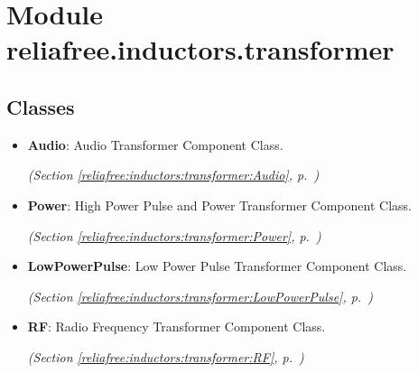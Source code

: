 %
%
%


\section{Module reliafree.inductors.transformer}

    \label{reliafree:inductors:transformer}


\subsection{Classes}

\begin{itemize}  \setlength{\parskip}{0ex}
  \item \textbf{Audio}: Audio Transformer Component Class.



  \textit{(Section \ref{reliafree:inductors:transformer:Audio}, p.~\pageref{reliafree:inductors:transformer:Audio})}

  \item \textbf{Power}: High Power Pulse and Power Transformer Component Class.



  \textit{(Section \ref{reliafree:inductors:transformer:Power}, p.~\pageref{reliafree:inductors:transformer:Power})}

  \item \textbf{LowPowerPulse}: Low Power Pulse Transformer Component Class.



  \textit{(Section \ref{reliafree:inductors:transformer:LowPowerPulse}, p.~\pageref{reliafree:inductors:transformer:LowPowerPulse})}

  \item \textbf{RF}: Radio Frequency Transformer Component Class.



  \textit{(Section \ref{reliafree:inductors:transformer:RF}, p.~\pageref{reliafree:inductors:transformer:RF})}

\end{itemize}

